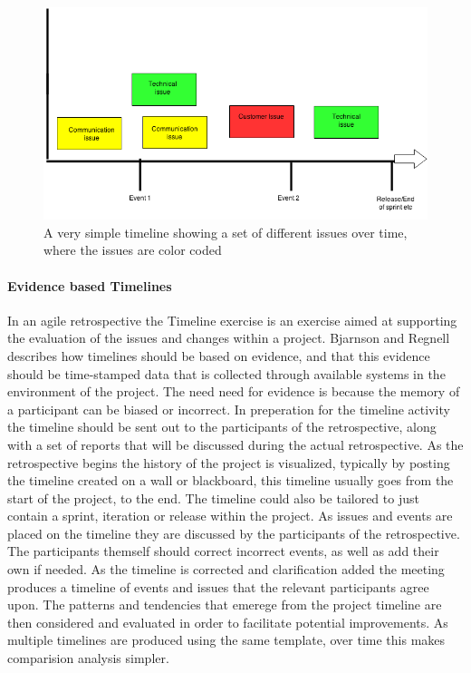 \documentclass[12pt]{article}
\begin{document}
\begin{figure}[h!]
	\centering
	\includegraphics[width=1\textwidth]{figures/Timeline-Example.png}
	\caption{A very simple timeline showing a set of different issues over time, where the issues are color coded}
	\label{figure:Timeline-Example}
\end{figure}


\paragraph{Evidence based Timelines}

In an agile retrospective the Timeline exercise is an exercise aimed at supporting the evaluation of the issues and changes within a project. Bjarnson and Regnell~\cite{Bjarnason2012} describes how timelines should be based on evidence, and that this evidence should be time-stamped data that is collected through available systems in the environment of the project. The need need for evidence is because the memory of a participant can be biased or incorrect. In preperation for the timeline activity the timeline should be sent out to the participants of the retrospective, along with a set of reports that will be discussed during the actual retrospective. As the retrospective begins the history of the project is visualized, typically by posting the timeline created on a wall or blackboard, this timeline usually goes from the start of the project, to the end. The timeline could also be tailored to just contain a sprint, iteration or release within the project. As issues and events are placed on the timeline they are discussed by the participants of the retrospective. The participants themself should correct incorrect events, as well as add their own if needed. As the timeline is corrected and clarification added the meeting produces a timeline of events and issues that the relevant participants agree upon. The patterns and tendencies that emerege from the project timeline are then considered and evaluated in order to facilitate potential improvements. As multiple timelines are produced using the same template, over time this makes comparision analysis simpler. 
\end{document}

